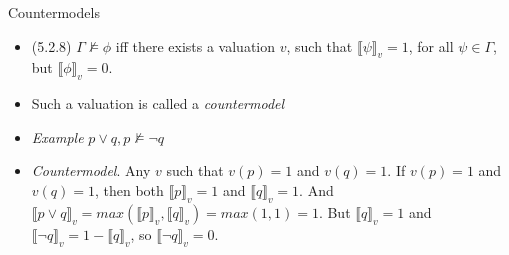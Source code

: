 \begin{frame}{Countermodels}

	\begin{itemize}
	
		\item (5.2.8) $\Gamma\nvDash\phi$ iff there exists a valuation $v$, such that $\llbracket\psi\rrbracket_v=1$, for all $\psi\in\Gamma$, but $\llbracket\phi\rrbracket_v=0$.
		
		\item Such a valuation is called a \emph{countermodel}
		
		\item \emph{Example} $p\lor q, p\nvDash \neg q$
			
		\item[] \emph{Countermodel}. Any $v$ such that $v(p)=1$ and $v(q)=1$. If $v(p)=1$ and $v(q)=1$, then both $\llbracket p\rrbracket_v=1$ and $\llbracket q\rrbracket_v=1$. And $\llbracket p\lor q\rrbracket_v=max(\llbracket p\rrbracket_v,\llbracket q\rrbracket_v)=max(1, 1)=1$. But $\llbracket q\rrbracket_v=1$ and $\llbracket \neg q\rrbracket_v=1-\llbracket q\rrbracket_v$, so $\llbracket \neg q\rrbracket_v=0$.

		
	\end{itemize}

\end{frame}


